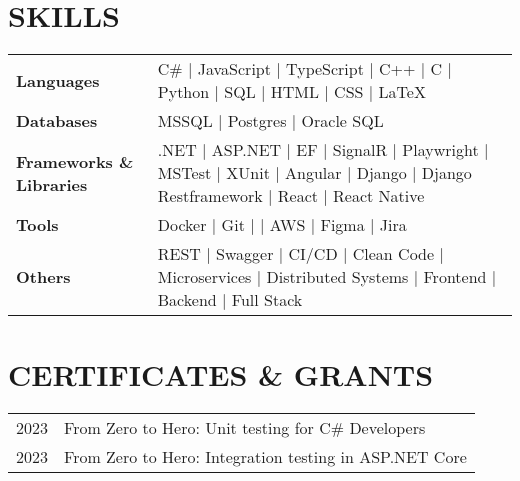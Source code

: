 \documentclass[letterpaper,11pt]{article}
\begin{document}

\section{SKILLS}

\begin{table}[htbp]
    \begin{tabularx}{\textwidth}{@{}lX@{}}
        \textbf{Languages} & C\# $\vert$ JavaScript $\vert$ TypeScript $\vert$ C++ $\vert$ C $\vert$ Python $\vert$ SQL $\vert$ HTML $\vert$ CSS $\vert$ \LaTeX \\
        \textbf{Databases} & MSSQL $\vert$ Postgres $\vert$ Oracle SQL \\
        \textbf{Frameworks \& Libraries} & .NET $\vert$ ASP.NET $\vert$ EF $\vert$ SignalR $\vert$ Playwright $\vert$ MSTest $\vert$ XUnit $\vert$ Angular $\vert$ Django $\vert$ Django Restframework $\vert$ React $\vert$ React Native \\
        \textbf{Tools} & Docker $\vert$ Git $\vert$ $\vert$ AWS $\vert$ Figma $\vert$ Jira \\
        \textbf{Others} & REST $\vert$ Swagger $\vert$ CI/CD $\vert$ Clean Code $\vert$ Microservices $\vert$ Distributed Systems $\vert$ Frontend $\vert$ Backend $\vert$ Full Stack \\
    \end{tabularx}
\end{table}

\section{CERTIFICATES \& GRANTS}
{
    \begin{tabularx}{\textwidth}{@{}lX@{}}
        2023 & From Zero to Hero: Unit testing for C\# Developers \\
        2023 & From Zero to Hero: Integration testing in ASP.NET Core \\
    \end{tabularx}
}
\end{document}
